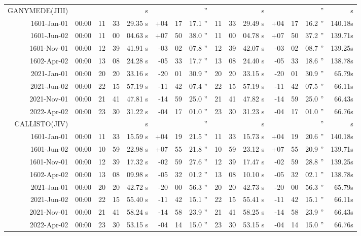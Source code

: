 \begin{longtable}{r@{\,}r|r@{h\,}r@{m\,}r<{s}|r@{°\,}r@{'\,}r<{''}||r@{h\,}r@{m\,}r<{s}|r@{°\,}r@{'\,}r<{''}r<{s}}
GANYMEDE(JIII)\\
 1601-Jan-01 & 00:00  &   11 & 33 & 29.35 & +04 & 17 & 17.1 & 11&33&29.49 & +04&17&16.2 & 140.18\\ %
 1601-Jun-02 & 00:00  &   11 & 00 & 04.63 & +07 & 50 & 38.0 & 11&00&04.78 & +07&50&37.2 & 139.71\\ %
 1601-Nov-01 & 00:00  &   12 & 39 & 41.91 & -03 & 02 & 07.8 & 12&39&42.07 & -03&02&08.7 & 139.25\\ %
 1602-Apr-02 & 00:00  &   13 & 08 & 24.28 & -05 & 33 & 17.7 & 13&08&24.40 & -05&33&18.6 & 138.78\\ %
 2021-Jan-01 & 00:00  &   20 & 20 & 33.16 & -20 & 01 & 30.9 & 20&20&33.15 & -20&01&30.9 & 65.79\\ %
 2021-Jun-02 & 00:00  &   22 & 15 & 57.19 & -11 & 42 & 07.4 & 22&15&57.19 & -11&42&07.5 & 66.11\\ %
 2021-Nov-01 & 00:00  &   21 & 41 & 47.81 & -14 & 59 & 25.0 & 21&41&47.82 & -14&59&25.0 & 66.43\\ %
 2022-Apr-02 & 00:00  &   23 & 30 & 31.22 & -04 & 17 & 01.0 & 23&30&31.23 & -04&17&01.0 & 66.76\\ %
CALLISTO(JIV) \\                                              
 1601-Jan-01 & 00:00  &   11 & 33 & 15.59 & +04 & 19 & 21.5 & 11&33&15.73 & +04&19&20.6 & 140.18\\ %
 1601-Jun-02 & 00:00  &   10 & 59 & 22.98 & +07 & 55 & 21.8 & 10&59&23.12 & +07&55&20.9 & 139.71\\ %
 1601-Nov-01 & 00:00  &   12 & 39 & 17.32 & -02 & 59 & 27.6 & 12&39&17.47 & -02&59&28.8 & 139.25\\ %
 1602-Apr-02 & 00:00  &   13 & 08 & 09.98 & -05 & 32 & 01.2 & 13&08&10.10 & -05&32&02.1 & 138.78\\ %
 2021-Jan-01 & 00:00  &   20 & 20 & 42.72 & -20 & 00 & 56.3 & 20&20&42.73 & -20&00&56.3 & 65.79\\ %
 2021-Jun-02 & 00:00  &   22 & 15 & 55.40 & -11 & 42 & 15.1 & 22&15&55.41 & -11&42&15.1 & 66.11\\ %
 2021-Nov-01 & 00:00  &   21 & 41 & 58.24 & -14 & 58 & 23.9 & 21&41&58.25 & -14&58&23.9 & 66.43\\ %
 2022-Apr-02 & 00:00  &   23 & 30 & 53.15 & -04 & 14 & 15.0 & 23&30&53.15 & -04&14&15.0 & 66.76\\ %

\end{longtable}
